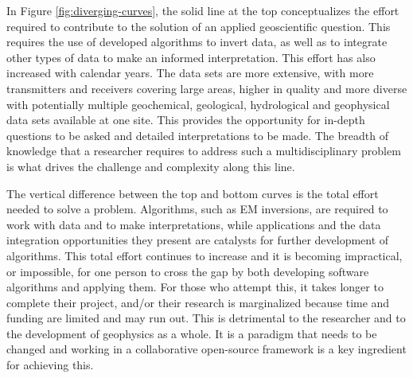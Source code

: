\documentclass[paper]{geophysics}
\begin{document}
In Figure \ref{fig:diverging-curves}, the solid line at the top conceptualizes the effort required to contribute to the solution of an applied geoscientific question. This requires the use of developed algorithms to invert data, as well as to integrate other types of data to make an informed interpretation. This effort has also increased with calendar years. The data sets are more extensive, with more transmitters and receivers covering large areas, higher in quality and more diverse with potentially multiple geochemical, geological, hydrological and geophysical data sets available at one site. This provides the opportunity for in-depth questions to be asked and detailed interpretations to be made. The breadth of knowledge that a researcher requires to address such a multidisciplinary problem is what drives the challenge and complexity along this line.

The vertical difference between the top and bottom curves is the total effort needed to solve a problem. Algorithms, such as EM inversions, are required to work with data and to make interpretations, while applications and the data integration opportunities they present are catalysts for  further development of algorithms. This total effort continues to increase and it is becoming impractical, or impossible, for one person to cross the gap by both developing software algorithms and applying them. For those who attempt this, it takes longer to complete their project, and/or their research is marginalized because time and funding are limited and may run out. This is detrimental to the researcher and to the development of geophysics as a whole. It is a paradigm that needs to be changed and working in a collaborative open-source framework is a key ingredient for achieving this.
\end{document}
